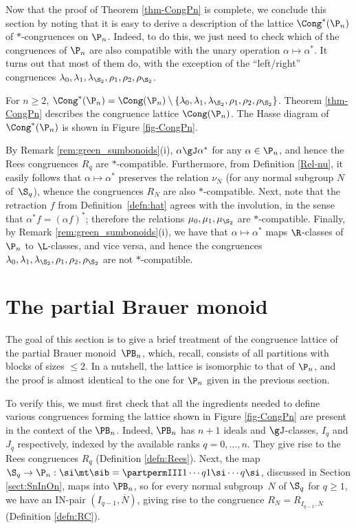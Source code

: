Now that the proof of Theorem \ref{thm-CongPn} is complete, we conclude this section by noting that it is easy to derive a description of the lattice $\Cong^*(\P_n)$ of $\ast$-congruences on $\P_n$.  Indeed, to do this, we just need to check which of the congruences of $\P_n$ are also compatible with the unary operation $\alpha\mapsto\alpha^\ast$.  It turns out that most of them do, with the exception of the ``left/right'' congruences $\lambda_0,\lambda_1,\lambda_{\S_2},\rho_1,\rho_2,\rho_{\S_2}$.


\begin{cor}\label{cor:main_Pn}
For $n\geq 2$, $\Cong^\ast(\P_n)=\Cong(\P_n)\setminus\{\lambda_0,\lambda_1,\lambda_{\S_2},\rho_1,\rho_2,\rho_{\S_2}\}$.  Theorem \ref{thm-CongPn} describes the congruence lattice $\Cong(\P_n)$.  The Hasse diagram of $\Cong^*(\P_n)$ is shown in Figure \ref{fig-CongPn}.
\end{cor}

\pf
By Remark \ref{rem:green_sumbonoids}(i), $\alpha\gJ\alpha^\ast$ for any $\alpha\in\P_n$, and hence the Rees congruences $R_q$ are $\ast$-compatible.
Furthermore, from Definition \ref{Rel-nu}, it easily follows that $\alpha\mapsto\alpha^\ast$ preserves the relation $\nu_N$ (for any normal subgroup $N$ of~$ \S_q$), whence the congruences $R_N$ are also $\ast$-compatible.
Next, note that the retraction $f$ from Definition~\ref{defn:hat} agrees with the involution, in the sense that $\alpha^\ast f=(\alpha f)^\ast$; therefore the relations $\mu_0,\mu_1,\mu_{\S_2}$ are $\ast$-compatible.
Finally, by  Remark \ref{rem:green_sumbonoids}(i), we have that $\alpha\mapsto\alpha^\ast$ maps $\R$-classes of $\P_n$ to $\L$-classes, and vice versa, and hence the congruences $\lambda_0,\lambda_1,\lambda_{\S_2},\rho_1,\rho_2,\rho_{\S_2}$ are not $\ast$-compatible.
\epf




\section{The partial Brauer monoid }\label{sec:PBn}


The goal of this section is to give a brief treatment of the congruence lattice of the partial Brauer monoid~$\PB_n$, which, recall, consists of all partitions with blocks of sizes $\leq 2$.
In a nutshell, the lattice is isomorphic to that of $\P_n$, and the proof is almost identical  to the one for $\P_n$ given in the previous section.

To verify this, we must first check that all the ingredients needed to define various congruences forming the lattice shown in Figure \ref{fig-CongPn} are present in the context of the $\PB_n$. Indeed, $\PB_n$ has $n+1$ ideals and $\gJ$-classes, $I_q$ and $J_q$ respectively, indexed by the available ranks $q=0,\dots, n$.
They give rise to the Rees congruences $R_q$ (Definition \ref{defn:Rees}).
Next, the map $\S_q\to\P_n:\si\mt\sib=\partpermIII1\cdots q{1\si}\cdots{q\si}$, discussed in Section \ref{sect:SnInOn}, maps into $\PB_n$, so for every normal subgroup~$N$ of $ \S_q$ for $q\geq1$, we have an IN-pair $(I_{q-1},\overline{N})$, giving rise to the congruence $R_N=R_{I_{q-1},\overline N}$ (Definition \ref{defn:RC}).
%


